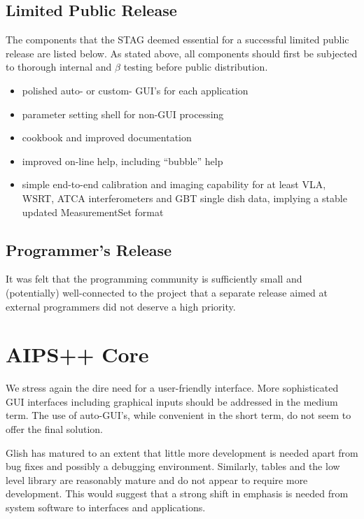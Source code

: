 \subsection{Limited Public Release}

The components that the STAG deemed essential for a successful limited
public release are listed below. As stated above, all components
should first be subjected to thorough internal and $\beta$ testing
before public distribution.

\begin{itemize}
\item  polished auto- or custom- GUI's for each application 

\item  parameter setting shell for non-GUI processing

\item  cookbook and improved documentation 

\item  improved on-line help, including ``bubble'' help
  
\item simple end-to-end calibration and imaging capability for at
  least VLA, WSRT, ATCA interferometers and GBT single dish data,
  implying a stable updated MeasurementSet format
\end{itemize}


\subsection{Programmer's Release}

It was felt that the programming community is sufficiently small and
(potentially) well-connected to the project that a separate release
aimed at external programmers did not deserve a high priority.


\section{AIPS++ Core}

We stress again the dire need for a user-friendly interface. More
sophisticated GUI interfaces including graphical inputs should be
addressed in the medium term. The use of auto-GUI's, while 
convenient in the short term, do not seem to offer the final solution.

Glish has matured to an extent that little more development is needed
apart from bug fixes and possibly a debugging environment. Similarly,
tables and the low level library are reasonably mature and do not 
appear to require more development. This would suggest that a strong
shift in emphasis is needed from system software to interfaces and
applications. 

